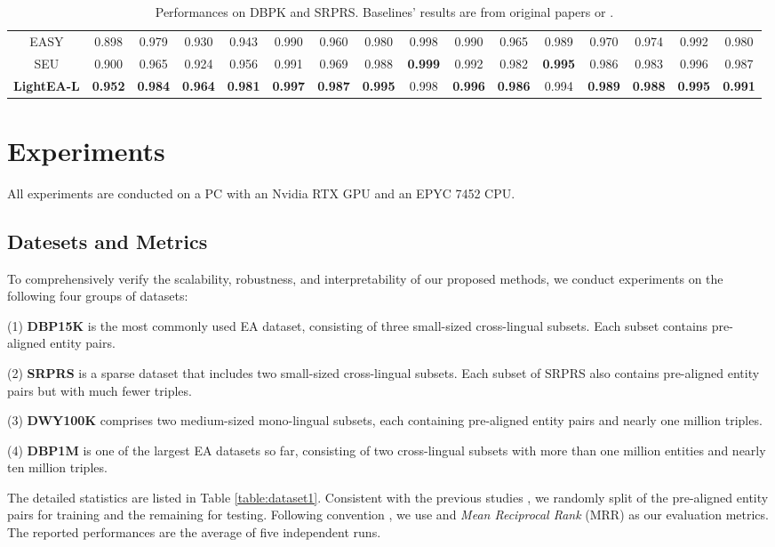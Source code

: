 \documentclass[11pt]{article}
\begin{document}
\begin{table*}[t]
\begin{center}
{\begin{tabular}{c|ccc|ccc|ccc|ccc|ccc}
  EASY &0.898& 0.979& 0.930 &0.943 &0.990 &0.960 &0.980 &0.998 &0.990 &0.965 &0.989 &0.970 &0.974 &0.992 &0.980\\
  SEU &0.900 &0.965 &0.924 &0.956 &0.991 &0.969 &0.988 &\textbf{0.999} &0.992 &0.982 &\textbf{0.995} &0.986 &0.983 &0.996 &0.987\\
  \textbf{LightEA-L} &\textbf{0.952}&\textbf{0.984}&\textbf{0.964}&\textbf{0.981}&\textbf{0.997}&\textbf{0.987}&\textbf{0.995}&0.998&\textbf{0.996}&\textbf{0.986}&0.994&\textbf{0.989}&\textbf{0.988 }&\textbf{0.995}&\textbf{0.991}\\
  \bottomrule
\end{tabular}
}
\caption{Performances on DBPK and SRPRS. Baselines' results are from original papers or \citet{9174835}.}
\label{table:res1}
\end{center}
\end{table*}

\section{Experiments}
All experiments are conducted on a PC with an Nvidia RTX GPU and an EPYC 7452 CPU.

\subsection{Datesets and Metrics}
To comprehensively verify the scalability, robustness, and interpretability of our proposed methods, we conduct experiments on the following four groups of datasets:

(1) \textbf{DBP15K} \cite{DBLP:conf/semweb/SunHL17} is the most commonly used EA dataset, consisting of three small-sized cross-lingual subsets.
Each subset contains  pre-aligned entity pairs.

(2) \textbf{SRPRS} \cite{DBLP:conf/icml/GuoSH19} is a sparse dataset that includes two small-sized cross-lingual subsets.
Each subset of SRPRS also contains  pre-aligned entity pairs but with much fewer triples.

(3) \textbf{DWY100K} \cite{DBLP:conf/ijcai/SunHZQ18} comprises two medium-sized mono-lingual subsets, each containing  pre-aligned entity pairs and nearly one million triples.

(4) \textbf{DBP1M} \cite{DBLP:journals/pvldb/GeLCZG21} is one of the largest EA datasets so far, consisting of two cross-lingual subsets with more than one million entities and nearly ten million triples.

The detailed statistics are listed in Table \ref{table:dataset1}.
Consistent with the previous studies \cite{DBLP:conf/semweb/SunHL17,DBLP:conf/ijcai/WuLF0Y019,DBLP:conf/wsdm/MaoWXLW20}, we randomly split  of the pre-aligned entity pairs for training and the remaining  for testing.
Following convention \cite{DBLP:conf/ijcai/ChenTYZ17,DBLP:conf/emnlp/WangLLZ18}, we use  and \emph{Mean Reciprocal Rank} (MRR) as our evaluation metrics.
The reported performances are the average of five independent runs.
\end{document}
